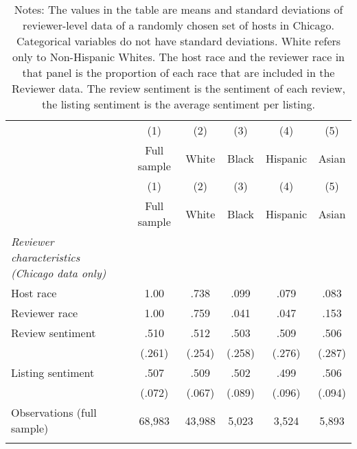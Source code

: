 
{
	\def\sym#1{\ifmmode^{#1}\else\(^{#1}\)\fi}
	\begin{longtable}{l*{5}{c}}
		\caption{Summary Statistics by Race: Reviewer Characteristics}\\
		\hline
		&\multicolumn{1}{c}{(1)}&\multicolumn{1}{c}{(2)}&\multicolumn{1}{c}{(3)}&\multicolumn{1}{c}{(4)}&\multicolumn{1}{c}{(5)}\\
		&\multicolumn{1}{c}{Full sample}&\multicolumn{1}{c}{White}&\multicolumn{1}{c}{Black}&\multicolumn{1}{c}{Hispanic}&\multicolumn{1}{c}{Asian}\\
		\hline\hline\endfirsthead\hline\endhead\hline\endfoot\endlastfoot
		&\multicolumn{1}{c}{(1)}&\multicolumn{1}{c}{(2)}&\multicolumn{1}{c}{(3)}&\multicolumn{1}{c}{(4)}&\multicolumn{1}{c}{(5)}\\
		&\multicolumn{1}{c}{Full sample}&\multicolumn{1}{c}{White}&\multicolumn{1}{c}{Black}&\multicolumn{1}{c}{Hispanic}&\multicolumn{1}{c}{Asian}\\
		\hline
		\endhead                  

		\textit{Reviewer characteristics (Chicago data only) } \\
		\hline
		Host race            &      1.00 &      .738&       .099         &      .079    &	.083     \\
		[1em]
		Reviewer race            &      1.00		&      .759	&       .041         &      .047    &	.153     \\
		[1em]
		Review sentiment            &      .510	&      .512&       .503         &      .509    &	.506     \\
		&     (.261)         &     (.254)         &     (.258)         &     (.276)         &		(.287)\\
		[1em]
		Listing sentiment            &      .507&      .509&       .502         &      .499    &	.506     \\
		&     (.072)         &     (.067)         &     (.089)         &     (.096)         &		(.094)\\
		
		\hline
		Observations (full sample)     & 68,983   &       43,988         &       5,023         &       3,524         &       5,893         \\
		\hline\hline
		\caption*{Notes: The values in the table are means and standard deviations of reviewer-level data of a randomly chosen set of hosts in Chicago. Categorical variables do not have standard deviations. White refers only to Non-Hispanic Whites. The host race and the reviewer race in that panel is the proportion of each race that are included in the Reviewer data. The review sentiment is the sentiment of each review, the listing sentiment is the average sentiment per listing.}
		
	\end{longtable}
}

